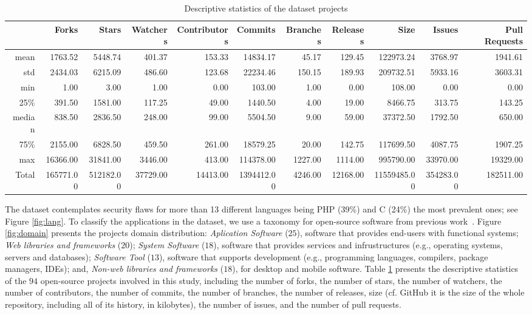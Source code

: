 \documentclass[10pt,conference]{IEEEtran}
\begin{document}
\begin{table}[h]
	\centering
	\caption{Descriptive statistics of the dataset projects}
\begin{tabular}{@{}rrrrrrrrrrr@{}}
\toprule
      & Forks   & Stars   & Watchers & Contributors & Commits  & Branches & Releases & Size      & Issues & Pull Requests  \\ \midrule
mean  & 1763.52 & 5448.74 & 401.37   & 153.33       & 14834.17 & 45.17    & 129.45   & 122973.24 & 3768.97   & 1941.61 \\
std   & 2434.03 & 6215.09 & 486.60   & 123.68       & 22234.46 & 150.15   & 189.93   & 209732.51 & 5933.16   & 3603.31 \\
min   & 1.00       & 3.00       & 1.00        & 0.00            & 103.00      & 1.00        & 0.00        & 108.00       & 0.00         & 0.00       \\
25\%  & 391.50  & 1581.00    & 117.25   & 49.00           & 1440.50  & 4.00        & 19.00       & 8466.75   & 313.75    & 143.25  \\
median  & 838.50  & 2836.50 & 248.00      & 99.00           & 5504.50  & 9.00        & 59.00       & 37372.50  & 1792.50   & 650.00     \\
75\%  & 2155.00    & 6828.50 & 459.50   & 261.00          & 18579.25 & 20.00       & 142.75   & 117699.50 & 4087.75   & 1907.25 \\
max   & 16366.00   & 31841.00   & 3446.00     & 413.00          & 114378.00   & 1227.00     & 1114.00     & 995790.00    & 33970.00     & 19329.00   \\
Total & 165771.00  & 512182.00  & 37729.00    & 14413.00        & 1394412.00  & 4246.00     & 12168.00    & 11559485.00  & 354283.00    & 182511.00  \\ \bottomrule
\end{tabular}
\label{tab:dataset}
\end{table}

The dataset contemplates security flaws for more than 13 different languages
being PHP (39\%) and C (24\%) the most prevalent ones; see Figure \ref{fig:lang}.
To classify the applications in the dataset, we use a taxonomy for open-source
software from previous work~\cite{7816479}. Figure \ref{fig:domain}
presents the projects domain distribution: \textit{Aplication Software} ($25$),
software that provides end-users with functional systems; \textit{Web libraries
and frameworks} ($20$); \textit{System Software} ($18$), software that provides
services and infrustructures (e.g., operating systems, servers and databases);
\textit{Software Tool} ($13$), software that supports development (e.g.,
programming languages, compilers, package managers, IDEs); and, \textit{Non-web
libraries and frameworks} ($18$), for desktop and mobile software.
%
Table \ref{tab:dataset} presents the descriptive statistics of the $94$
open-source projects involved in this study, including the number of forks, the number of
stars, the number of watchers, the number of contributors, the number of commits, the number of
branches, the number of releases,  size (cf. GitHub it is the size of the whole
repository, including all of its history, in kilobytes), the number of issues, and the
number of pull requests.
\end{document}
